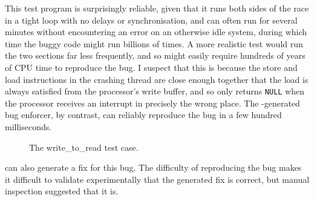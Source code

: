 This test program is surprisingly reliable, given that it runs both
sides of the race in a tight loop with no delays or synchronisation,
and can often run for several minutes without encountering an error on
an otherwise idle system, during which time the buggy code might run
billions of times.  A more realistic test would run the two sections
far less frequently, and so might easily require hundreds of years of
CPU time to reproduce the bug.  I suspect that this is because the
store and load instructions in the crashing thread are close enough
together that the load is always satisfied from the processor's write
buffer, and so only returns \texttt{NULL} when the processor receives
an interrupt in precisely the wrong place.  The {\technique}-generated
bug enforcer, by contrast, can reliably reproduce the bug in a few
hundred milliseconds.

\begin{figure}
  \centerline{
    {\hfill}
  \hfill
    {\hfill}
    }
  \caption{The write\_to\_read test case.}
  \label{fig:eval:write_to_read}
\end{figure}

{\Technique} can also generate a fix for this bug.  The difficulty of
reproducing the bug makes it difficult to validate experimentally that
the generated fix is correct, but manual inspection suggested that it
is.

